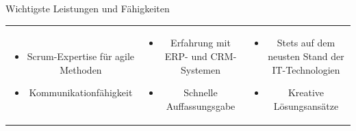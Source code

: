 \documentclass{resume} %
\begin{document}


    


\begin{rSection}
    {Wichtigste Leistungen und Fähigkeiten}

    \begin{tabular}{ccc}
        \begin{minipage}{0.3\textwidth}
        \begin{itemize}
        \item \raggedright{Scrum-Expertise für agile Methoden}
        \item Kommunikationfähigkeit
        \end{itemize}
        \end{minipage} &
        \begin{minipage}{0.3\textwidth}
        \begin{itemize}
        \item \raggedright{Erfahrung mit ERP- und CRM-Systemen}
        \item Schnelle Auffassungsgabe
        \end{itemize}
        \end{minipage} &
        \begin{minipage}{0.3\textwidth}
        \begin{itemize}
        \item Stets auf dem neusten Stand der IT-Technologien
        \item Kreative Lösungsansätze
        \end{itemize}
        \end{minipage}
        \end{tabular}

\end{rSection}
\end{document}
